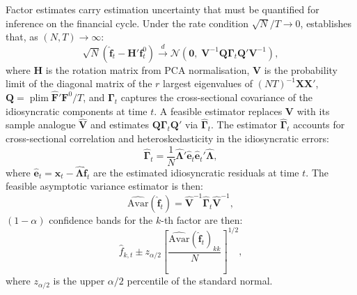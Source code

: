 Factor estimates carry estimation uncertainty that must be quantified for inference on the financial cycle. Under the rate condition $\sqrt{N}/T\to 0$, \citet{bai2003inferential} establishes that, as $(N,T)\to\infty$:
\begin{equation}
    \sqrt{N}\left(\hat{\boldsymbol{f}}_t - \boldsymbol{H}'\boldsymbol{f}_t^0\right) \xrightarrow{d} \mathcal{N}\!\left(\boldsymbol{0},\; \boldsymbol{V}^{-1}\boldsymbol{Q}\boldsymbol{\Gamma}_t\boldsymbol{Q}'\boldsymbol{V}^{-1}\right),
    \label{eq:factor_clt}
\end{equation}
where $\boldsymbol{H}$ is the rotation matrix from PCA normalisation, $\boldsymbol{V}$ is the probability limit of the diagonal matrix of the $r$ largest eigenvalues of $(NT)^{-1}\boldsymbol{X}\boldsymbol{X}'$, $\boldsymbol{Q}=\operatorname{plim}\hat{\boldsymbol{F}}'\boldsymbol{F}^0/T$, and $\boldsymbol{\Gamma}_t$ captures the cross-sectional covariance of the idiosyncratic components at time $t$. A feasible estimator replaces $\boldsymbol{V}$ with its sample analogue $\hat{\boldsymbol{V}}$ and estimates $\boldsymbol{Q}\boldsymbol{\Gamma}_t\boldsymbol{Q}'$ via $\hat{\boldsymbol{\Gamma}}_t$. The estimator $\hat{\boldsymbol{\Gamma}}_t$ accounts for cross-sectional correlation and heteroskedasticity in the idiosyncratic errors:
\begin{equation}
    \hat{\boldsymbol{\Gamma}}_t = \frac{1}{N}\hat{\boldsymbol{\Lambda}}'\hat{\boldsymbol{e}}_t\hat{\boldsymbol{e}}_t'\hat{\boldsymbol{\Lambda}},
    \label{eq:gamma_hat}
\end{equation}
where $\hat{\boldsymbol{e}}_t = \boldsymbol{x}_t - \hat{\boldsymbol{\Lambda}}\hat{\boldsymbol{f}}_t$ are the estimated idiosyncratic residuals at time $t$. The feasible asymptotic variance estimator \citep{bai2003inferential} is then:
\begin{equation}
    \widehat{\mathrm{Avar}}(\hat{\boldsymbol{f}}_t) = \hat{\boldsymbol{V}}^{-1}\hat{\boldsymbol{\Gamma}}_t\hat{\boldsymbol{V}}^{-1},
    \label{eq:avar_hat}
\end{equation}
$(1-\alpha)$ confidence bands for the $k$-th factor are then:
\begin{equation}
    \hat{f}_{k,t} \pm z_{\alpha/2}\left[\frac{\widehat{\mathrm{Avar}}(\hat{\boldsymbol{f}}_t)_{kk}}{N}\right]^{1/2},
    \label{eq:ci_factor}
\end{equation}
where $z_{\alpha/2}$ is the upper $\alpha/2$ percentile of the standard normal.
